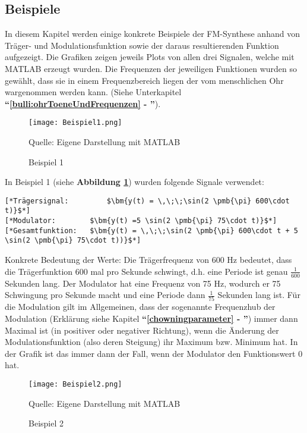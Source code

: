 \FloatBarrier
\subsection{Beispiele}
In diesem Kapitel werden einige konkrete Beispiele der FM-Synthese anhand von Träger- und Modulationsfunktion sowie der daraus resultierenden Funktion aufgezeigt. Die Grafiken zeigen jeweils Plots von allen drei Signalen, welche mit MATLAB erzeugt wurden.
Die Frequenzen der jeweiligen Funktionen wurden so gewählt, dass sie in einem Frequenzbereich liegen der vom menschlichen Ohr wargenommen werden kann. (Siehe Unterkapitel \textbf{``\ref{bulli:ohrToeneUndFrequenzen} - ''}).

\begin{figure} [ht]
\centering
  \texttt{[image: Beispiel1.png]}
\caption{Beispiel 1}
\label{fig:beispiel1}
Quelle: Eigene Darstellung mit MATLAB
\end{figure}

In Beispiel 1 (siehe \textbf{Abbildung \ref{fig:beispiel1}})  wurden folgende Signale verwendet:

\begin{lstlisting}[mathescape]
[*Trägersignal: 		$\bm{y(t) = \,\;\;\sin(2 \pmb{\pi} 600\cdot t)}$*]
[*Modulator:		$\bm{y(t) =5 \sin(2 \pmb{\pi} 75\cdot t)}$*]
[*Gesamtfunktion: 	$\bm{y(t) = \,\;\;\sin(2 \pmb{\pi} 600\cdot t + 5 \sin(2 \pmb{\pi} 75\cdot t))}$*]
\end{lstlisting}

Konkrete Bedeutung der Werte: Die Trägerfrequenz von 600 Hz bedeutet, dass die Trägerfunktion 600 mal pro Sekunde schwingt, d.h. eine Periode ist genau $\frac{1}{600}$ Sekunden lang. Der Modulator hat eine Frequenz von 75 Hz, wodurch er 75 Schwingung pro Sekunde macht und eine Periode dann $\frac{1}{75}$ Sekunden lang ist. Für die Modulation gilt im Allgemeinen, dass der sogenannte Frequenzhub der Modulation (Erklärung siehe Kapitel \textbf{``\ref{chowningparameter} - ''}) immer dann Maximal ist (in positiver oder negativer Richtung), wenn die Änderung der Modulationsfunktion (also deren Steigung) ihr Maximum bzw. Minimum hat. In der Grafik ist das immer dann der Fall, wenn der Modulator den Funktionswert 0 hat.

\begin{figure} [ht]
\centering
  \texttt{[image: Beispiel2.png]}
\caption{Beispiel 2}
\label{fig:beispiel2}
Quelle: Eigene Darstellung mit MATLAB
\end{figure}

